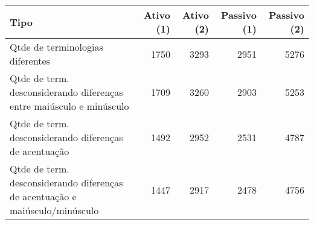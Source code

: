 \begin{table}[ht]
\centering
\begin{tabular}{lrrrr}
  \hline
Tipo & Ativo (1) & Ativo (2) & Passivo (1) & Passivo (2) \\ 
  \hline
Qtde de terminologias diferentes & 1750 & 3293 & 2951 & 5276 \\ 
  Qtde de term. desconsiderando diferenças entre maiúsculo e minúsculo & 1709 & 3260 & 2903 & 5253 \\ 
  Qtde de term. desconsiderando diferenças de acentuação & 1492 & 2952 & 2531 & 4787 \\ 
  Qtde de term. desconsiderando diferenças de acentuação e
          maiúsculo/minúsculo & 1447 & 2917 & 2478 & 4756 \\ 
   \hline
\end{tabular}
\end{table}
